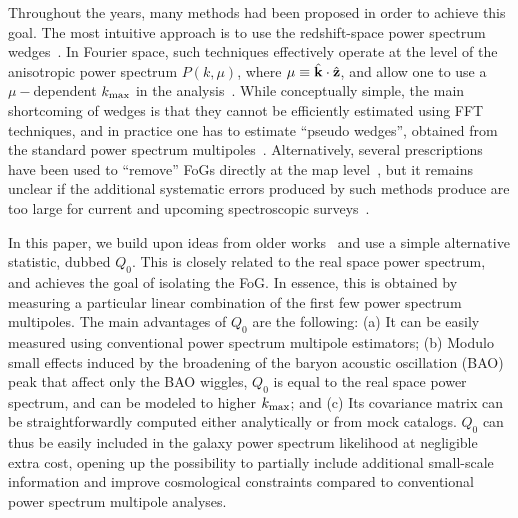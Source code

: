 \documentclass[12pt,a4paper]{article}
\renewcommand\k{{\bf k}}
\renewcommand{\k}{{\bf k}}
\newcommand{\z}{{\bf z}}
\begin{document}
Throughout the years, many methods had been proposed in order to achieve this goal. The most intuitive approach is to use the redshift-space power spectrum wedges~\cite{Kazin:2011xt,Grieb:2016uuo}. In Fourier space, such techniques effectively operate at the level of the anisotropic power spectrum $P(k,\mu)$, where $\mu\equiv \hat \k \cdot \hat\z$, 
and allow one to use a $\mu-$dependent $k_{\rm max}$ in the analysis~\cite{Grieb:2016uuo}. While conceptually simple, the main shortcoming of wedges is that they cannot be efficiently estimated using FFT techniques, and in practice one has to estimate ``pseudo wedges'', obtained from the standard power spectrum multipoles~\cite{Grieb:2016uuo}. Alternatively, several prescriptions have been used to ``remove'' FoGs directly at the map level~\cite{Tegmark:2001jh,SDSS:2003tbn,Reid:2008zu}, but it remains unclear if the additional systematic errors produced by such methods produce are too large for current and upcoming spectroscopic surveys~\cite{Reid:2008zu}.

In this paper, we build upon ideas from older works~\cite{Hamilton:2000du,Tegmark:2001jh,SDSS:2003tbn,Scoccimarro:2004tg} and use a simple alternative statistic, dubbed $Q_0$. This is closely related to the real space power spectrum, and achieves the goal of isolating the FoG. In essence, this is obtained by measuring a particular linear combination of the first few power spectrum multipoles. The main advantages of $Q_0$ are the following: (a) It can be easily measured using conventional power spectrum multipole estimators; (b) Modulo small effects induced by the broadening of the baryon acoustic oscillation (BAO) peak that affect only the BAO wiggles, $Q_0$ is equal to the real space power spectrum, and can be modeled to higher $k_{\rm max}$; and (c) Its covariance matrix can be straightforwardly computed either analytically or from mock catalogs. $Q_0$ can thus be easily included in the galaxy power spectrum likelihood at negligible extra cost, opening up the possibility to partially include additional small-scale information and improve cosmological constraints compared to conventional power spectrum multipole analyses.
\end{document}
